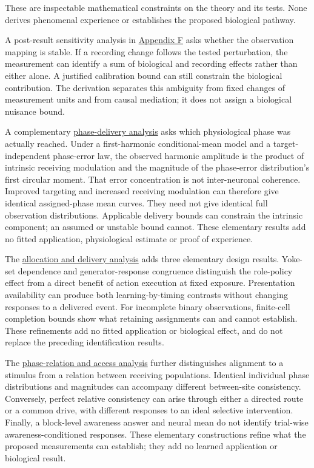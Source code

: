 \documentclass[
  american,
  11pt,
  letterpaper,
]{article}
\begin{document}
These are inspectable mathematical constraints on the theory and its tests. None derives phenomenal experience or establishes the proposed biological pathway.

A post-result sensitivity analysis in \href{https://zenodo.org/records/23455801/files/Learning-to-Feel-Technical-Supplement-v1.1.pdf\#appendix-f}{Appendix F} asks whether the observation mapping is stable. If a recording change follows the tested perturbation, the measurement can identify a sum of biological and recording effects rather than either alone. A justified calibration bound can still constrain the biological contribution. The derivation separates this ambiguity from fixed changes of measurement units and from causal mediation; it does not assign a biological nuisance bound.

A complementary \href{https://zenodo.org/records/23455801/files/Learning-to-Feel-Technical-Supplement-v1.1.pdf\#appendix-g}{phase-delivery analysis} asks which physiological phase was actually reached. Under a first-harmonic conditional-mean model and a target-independent phase-error law, the observed harmonic amplitude is the product of intrinsic receiving modulation and the magnitude of the phase-error distribution's first circular moment. That error concentration is not inter-neuronal coherence. Improved targeting and increased receiving modulation can therefore give identical assigned-phase mean curves. They need not give identical full observation distributions. Applicable delivery bounds can constrain the intrinsic component; an assumed or unstable bound cannot. These elementary results add no fitted application, physiological estimate or proof of experience.

The \href{https://zenodo.org/records/23455801/files/Learning-to-Feel-Technical-Supplement-v1.1.pdf\#appendix-i}{allocation and delivery analysis} adds three elementary design results. Yoke-set dependence and generator-response congruence distinguish the role-policy effect from a direct benefit of action execution at fixed exposure. Presentation availability can produce both learning-by-timing contrasts without changing responses to a delivered event. For incomplete binary observations, finite-cell completion bounds show what retaining assignments can and cannot establish. These refinements add no fitted application or biological effect, and do not replace the preceding identification results.

The \href{https://zenodo.org/records/23455801/files/Learning-to-Feel-Technical-Supplement-v1.1.pdf\#appendix-h}{phase-relation and access analysis} further distinguishes alignment to a stimulus from a relation between receiving populations. Identical individual phase distributions and magnitudes can accompany different between-site consistency. Conversely, perfect relative consistency can arise through either a directed route or a common drive, with different responses to an ideal selective intervention. Finally, a block-level awareness answer and neural mean do not identify trial-wise awareness-conditioned responses. These elementary constructions refine what the proposed measurements can establish; they add no learned application or biological result.
\end{document}
